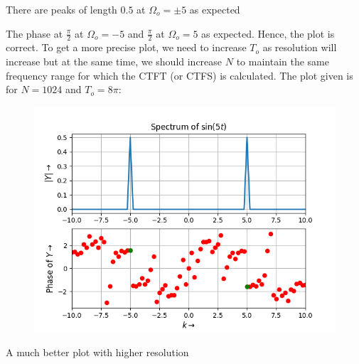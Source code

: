 \documentclass[12pt, a4paper]{article}
\begin{document}
\begin{center}
    There are peaks of length $0.5$ at $\Omega_{o} = \pm5$ as expected
\end{center}
The phase at $\frac{\pi}{2}$ at $\Omega_{o}=-5$ and $\frac{\pi}{2}$ at $\Omega_{o}=5$ as expected. Hence, the plot is correct. To get a more precise plot, we need to increase $T_{o}$ as resolution will increase but at the same time, we should increase $N$ to maintain the same frequency range for which the CTFT (or CTFS) is calculated. The plot given is for $N=1024$ and $T_{o}=8\pi$:

\begin{figure}[H]
    \centering
    \includegraphics[scale = 0.8]{Figure_2.png}
    \label{fig:sample}
\end{figure}
\begin{center}
    A much better plot with higher resolution
\end{center}
\end{document}
